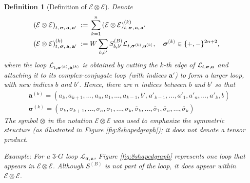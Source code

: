 \documentclass[10pt,reqno]{article}
\theoremstyle{plain} %
\newtheorem{definition}[theorem]{Definition}
\theoremstyle{remark}
\numberwithin{equation}{section}
\begin{document}
 
\begin{definition}[Definition of $\mathcal{E}\otimes  \mathcal{E}$]\label{def:CALE} 
Denote 
  \begin{align}\label{defEOTE}
 \left( \mathcal{E}\otimes  \mathcal{E} \right)_{t, \,\boldsymbol{\sigma}, \,\textbf{a}, \,\textbf{a}'} \; := \; &
 \sum_{k=1}^n\left( \mathcal{E}\otimes  \mathcal{E} \right)^{(k)}_{t, \,\boldsymbol{\sigma}, \,\textbf{a}, \,\textbf{a}'}
 \nonumber \\
 \left( \mathcal{E}\otimes  \mathcal{E} \right)^{(k)}_{t, \,\boldsymbol{\sigma}, \,\textbf{a}, \,\textbf{a}'}
\; := \; & W \sum_{b,b'} S^{(B)}_{b,b'}{\cal L}_{t, \boldsymbol{\sigma}^{(k ) },\textbf{a}^{(k )}},\quad \boldsymbol{\sigma}^{(k ) }\in \{+,-\}^{2n+2}, 
\end{align}
where the loop ${\cal L}_{t, \boldsymbol{\sigma}^{(k)},\textbf{a}^{(k)}}$ is obtained by cutting the $k$-th edge of ${\cal L}_{t,\boldsymbol{\sigma},\textbf{a}}$ and attaching it to its complex-conjugate loop (with indices $\textbf{a}'$) to form a larger loop, with new indices $b$ and $b'$. Hence, there are $n$ indices between $b$ and $b'$ so that
\begin{align}\label{def_diffakn_k}
   & \textbf{a}^{(k )}=(a_k,a_{k+1},\ldots,a_n,a_1,\ldots,a_{k-1},b',a'_{k-1},\ldots,a'_1,a'_n,\ldots,a'_k,b)
    \nonumber \\
  &  \boldsymbol{\sigma}^{(k )}=(\sigma_k,\sigma_{k+1},\ldots,\sigma_n,\sigma_1,\ldots,\sigma_k,\overline\sigma_k,\ldots,\overline\sigma_1,\overline\sigma_n,\ldots,\overline\sigma_k)
\end{align}
The symbol $\otimes$ in the notation $\mathcal{E} \otimes \mathcal{E}$ was used  to emphasize the symmetric structure (as illustrated in Figure \ref{fig:8shapedgraph}); it  does not denote a tensor product.  

Example: For a $3\text{-}G$ loop $\mathcal{L}_{\boldsymbol{\sigma}, \mathbf{a}}$, Figure \ref{fig:8shapedgraph} represents one loop that appears in $\mathcal{E} \otimes \mathcal{E}$. Although $S^{(B)}$ is not part of the loop, it does appear within $\mathcal{E} \otimes \mathcal{E}$.

 
\begin{figure}[ht]
\centering
\begin{minipage}{0.45\textwidth} %
    \centering
    \begin{tikzpicture}[scale=1.0]


\end{tikzpicture}
\end{minipage}
\end{figure}
\end{definition}
\end{document}
